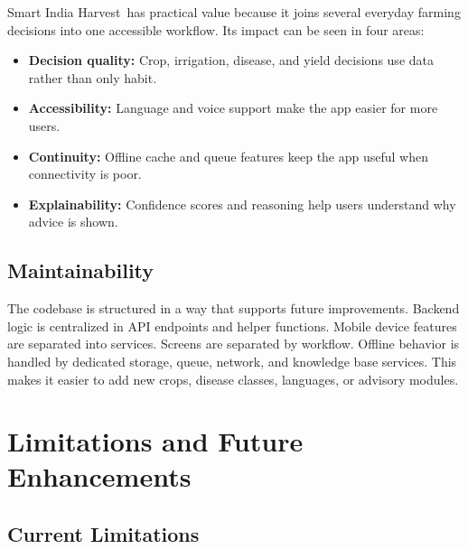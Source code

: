 \documentclass[12pt,a4paper]{report}
\newcommand{\ProjectName}{Smart India Harvest}
\begin{document}
\ProjectName\ has practical value because it joins several everyday farming decisions into one accessible workflow. Its impact can be seen in four areas:

\begin{itemize}[leftmargin=1.5em]
  \item \textbf{Decision quality:} Crop, irrigation, disease, and yield decisions use data rather than only habit.
  \item \textbf{Accessibility:} Language and voice support make the app easier for more users.
  \item \textbf{Continuity:} Offline cache and queue features keep the app useful when connectivity is poor.
  \item \textbf{Explainability:} Confidence scores and reasoning help users understand why advice is shown.
\end{itemize}

\section{Maintainability}

The codebase is structured in a way that supports future improvements. Backend logic is centralized in API endpoints and helper functions. Mobile device features are separated into services. Screens are separated by workflow. Offline behavior is handled by dedicated storage, queue, network, and knowledge base services. This makes it easier to add new crops, disease classes, languages, or advisory modules.

\singlespacing

\chapter{Limitations and Future Enhancements}
\doublespacing

\section{Current Limitations}
\end{document}

